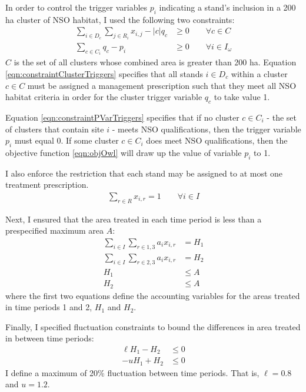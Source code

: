 In order to control the trigger variables $p_i$ indicating a stand's inclusion in a 200 ha cluster of NSO habitat, I used the following two constraints:
\begin{align}
\sum_{i \in D_c} \sum_{j \in R_i} x_{i,j} - |c| q_c &\ge 0 \qquad \forall c \in C \label{eqn:constraintClusterTriggers}\\
\sum_{c \in C_i} q_c - p_i &\ge 0 \qquad \forall i \in I_\omega \label{eqn:constraintPVarTriggers}
\end{align}
$C$ is the set of all clusters whose combined area is greater than 200 ha. Equation \eqref{eqn:constraintClusterTriggers} specifies that all stands $i \in D_c$ within a cluster $c \in C$ must be assigned a management prescription such that they meet all NSO habitat criteria in order for the cluster trigger variable $q_c$ to take value 1.

Equation \eqref{eqn:constraintPVarTriggers} specifies that if no cluster $c \in C_i$ - the set of clusters that contain site $i$ - meets NSO qualifications, then the trigger variable $p_i$ must equal 0. If some cluster $c \in C_i$ does meet NSO qualifications, then the objective function \eqref{eqn:objOwl} will draw up the value of variable $p_i$ to 1.

I also enforce the restriction that each stand may be assigned to at most one treatment prescription.
\begin{align}
\sum_{r \in R} x_{i,r} = 1  \qquad \forall i \in I \label{eqn:constraintOnePrescrip}
\end{align}

Next, I ensured that the area treated in each time period is less than a prespecified maximum area $A$:
\begin{align}
\sum_{i \in I} \sum_{r \in 1,3} a_i x_{i,r} &= H_1 \label{eqn:constraintAreaAcctg1}\\
\sum_{i \in I} \sum_{r \in 2,3} a_i x_{i,r} &= H_2 \label{eqn:constraintAreaAcctg2}\\
H_1 &\le A \label{eqn:constraintAreaRestr1}\\
H_2 &\le A \label{eqn:constraintAreaRestr2}
\end{align}
where the first two equations define the accounting variables for the areas treated in time periods 1 and 2, $H_1$ and $H_2$.

Finally, I specified fluctuation constraints to bound the differences in area treated in between time periods:
\begin{align}
\ell H_1 - H_2 &\le 0 \label{eqn:constraintAreaFlucL}\\
-u H_1 + H_2 &\le 0 \label{eqn:constraintAreaFlucU}
\end{align}
I define a maximum of 20\% fluctuation between time periods. That is, $\ell = 0.8$ and $u = 1.2$.

